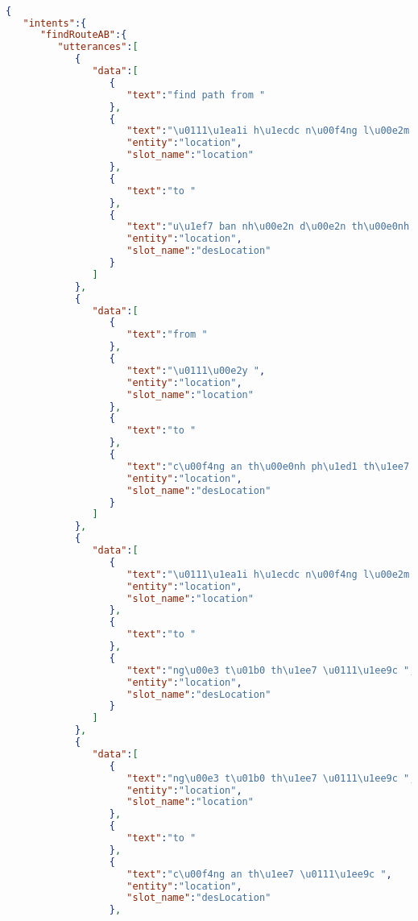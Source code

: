 \begin{lstlisting}[language=json,firstnumber=1]

{
   "intents":{
      "findRouteAB":{
         "utterances":[
            {
               "data":[
                  {
                     "text":"find path from "
                  },
                  {
                     "text":"\u0111\u1ea1i h\u1ecdc n\u00f4ng l\u00e2m th\u00e0nh ph\u1ed1 h\u1ed3 ch\u00ed minh ",
                     "entity":"location",
                     "slot_name":"location"
                  },
                  {
                     "text":"to "
                  },
                  {
                     "text":"u\u1ef7 ban nh\u00e2n d\u00e2n th\u00e0nh ph\u1ed1 th\u1ee7 \u0111\u1ee9c ",
                     "entity":"location",
                     "slot_name":"desLocation"
                  }
               ]
            },
            {
               "data":[
                  {
                     "text":"from "
                  },
                  {
                     "text":"\u0111\u00e2y ",
                     "entity":"location",
                     "slot_name":"location"
                  },
                  {
                     "text":"to "
                  },
                  {
                     "text":"c\u00f4ng an th\u00e0nh ph\u1ed1 th\u1ee7 \u0111\u1ee9c ",
                     "entity":"location",
                     "slot_name":"desLocation"
                  }
               ]
            },
            {
               "data":[
                  {
                     "text":"\u0111\u1ea1i h\u1ecdc n\u00f4ng l\u00e2m th\u00e0nh ph\u1ed1 h\u1ed3 ch\u00ed minh ",
                     "entity":"location",
                     "slot_name":"location"
                  },
                  {
                     "text":"to "
                  },
                  {
                     "text":"ng\u00e3 t\u01b0 th\u1ee7 \u0111\u1ee9c ",
                     "entity":"location",
                     "slot_name":"desLocation"
                  }
               ]
            },
            {
               "data":[
                  {
                     "text":"ng\u00e3 t\u01b0 th\u1ee7 \u0111\u1ee9c ",
                     "entity":"location",
                     "slot_name":"location"
                  },
                  {
                     "text":"to "
                  },
                  {
                     "text":"c\u00f4ng an th\u1ee7 \u0111\u1ee9c ",
                     "entity":"location",
                     "slot_name":"desLocation"
                  },

\end{lstlisting}
